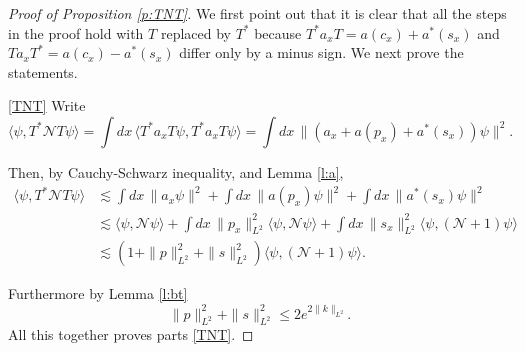 \documentclass[11pt,a4paper,DIV11]{scrartcl}	%
\newcommand{\N}{\mathcal{N}}
\newcommand{\K}{\mathcal{K}}
\begin{document}
\begin{proof}[Proof of Proposition \ref{p:TNT}]
  We first point out that it is clear that all the steps in the proof hold
  with $T$ replaced by $T^*$ because $T^* a_x T = a(c_x) + a^*(s_x)$ and $T
  a_x T^* = a(c_x) - a^*(s_x)$ differ only by a minus sign. We next prove
  the statements.


  \eqref{TNT} Write
  \[
    \langle \psi, T^* \N T \psi \rangle = \int dx \, \langle T^* a_x T \psi,
    T^* a_x T \psi \rangle = \int dx \, \| (a_x + a(p_x) + a^*(s_x)) \psi
    \|^2.
  \]
  \iffalse and
  \[
    \langle \psi, T^* \K T \psi \rangle = \int dx \, \langle T^* \nabla_x a_x
    T \psi, T^* \nabla_x a_x T \psi \rangle = \int dx \, \| (\nabla a_x +
    a(\nabla_x p_x) + a^*(\nabla_x s_x)) \psi \|^2.
  \]\fi
  Then, by Cauchy-Schwarz inequality, and Lemma \ref{l:a},
  \begin{align*}
    \langle \psi, T^* \N T \psi \rangle & \apprle \int dx \, \| a_x \psi \|^2
    + \int dx \, \| a(p_x) \psi \|^2 + \int dx \, \| a^*(s_x) \psi \|^2 \\
    & \apprle \langle \psi, \N \psi \rangle + \int dx \, \| p_x \|_{L^2}^2
    \langle \psi, \N \psi \rangle + \int dx \, \| s_x \|_{L^2}^2 \langle
    \psi, (\N+1) \psi \rangle \\
    & \apprle (1 + \| p \|_{L^2}^2 + \| s \|_{L^2}^2) \langle \psi, (\N+1) \psi
    \rangle.
  \end{align*}
  \iffalse and
  \begin{align*}
    \langle \psi, T^* \K T \psi \rangle & \apprle \int dx \, \| \nabla_x a_x
    \psi \|^2 + \int dx \, \| a(\nabla_x p_x) \psi \|^2 + \int dx \, \|
    a^*(\nabla_x s_x) \psi \|^2 \\
    & = \langle \psi, \K \psi \rangle + \int dx \, \| a(\nabla_x p_x) \psi
    \|^2 + \int dx \, \| a(\nabla_x s_x) \psi \|^2 + \| \nabla_2 s \|_{L^2}^2
    \\
    & \apprle (1 + \| p \|_{L^2}^2 + \| s \|_{L^2}^2) \langle \psi, \K \psi
    \rangle + \| \nabla_2 s \|_{L^2}^2.
  \end{align*}\fi
  Furthermore by Lemma \ref{l:bt}
  \begin{equation} \label{c1}
    \| p \|_{L^2}^2 + \| s \|_{L^2}^2 \le 2 e^{2 \| k \|_{L^2}}.%
  \end{equation}
  All this together proves parts \eqref{TNT}.
  


\end{proof}
\end{document}
